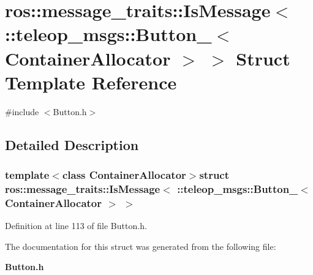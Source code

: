 \section{ros::message\_\-traits::IsMessage$<$ ::teleop\_\-msgs::Button\_\-$<$ ContainerAllocator $>$ $>$ Struct Template Reference}
\label{structros_1_1message__traits_1_1IsMessage_3_01_1_1teleop__msgs_1_1Button___3_01ContainerAllocator_01_4_01_4}


{\ttfamily \#include $<$Button.h$>$}



\subsection{Detailed Description}
\subsubsection*{template$<$class ContainerAllocator$>$struct ros::message\_\-traits::IsMessage$<$ ::teleop\_\-msgs::Button\_\-$<$ ContainerAllocator $>$ $>$}



Definition at line 113 of file Button.h.



The documentation for this struct was generated from the following file:\begin{DoxyCompactItemize}
\item 
{\bf Button.h}\end{DoxyCompactItemize}
